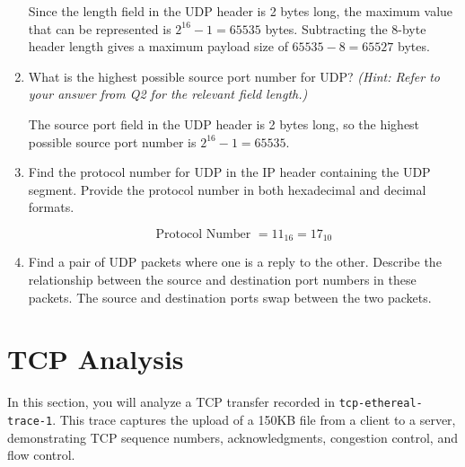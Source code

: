 \documentclass[12pt]{article}
\begin{document}
\begin{enumerate}[label=Q\arabic*:]
          Since the length field in the UDP header is 2 bytes long, the maximum
          value that can be represented is $2^{16} - 1 = 65535$ bytes.
          Subtracting the 8-byte header length gives a maximum payload size of
          $65535 - 8 = 65527$ bytes.

    \item What is the highest possible source port number for UDP?
          \textit{(Hint: Refer to your answer from Q2 for the relevant field length.)}

          The source port field in the UDP header is 2 bytes long, so the highest possible source port number is $2^{16} - 1 = 65535$.

    \item Find the protocol number for UDP in the IP header containing the UDP
          segment. Provide the protocol number in both hexadecimal and decimal
          formats.

          \begin{equation*}
              \text{Protocol Number } = 11_{16} = 17_{10}
          \end{equation*}

    \item Find a pair of UDP packets where one is a reply to the other. Describe the relationship between the source and destination port numbers in these packets.
          The source and destination ports swap between the two packets.
\end{enumerate}

\section*{TCP Analysis}

In this section, you will analyze a TCP transfer recorded in \texttt{tcp-ethereal-trace-1}. This trace captures the upload of a 150KB file from a client to a server, demonstrating TCP sequence numbers, acknowledgments, congestion control, and flow control.
\end{document}
